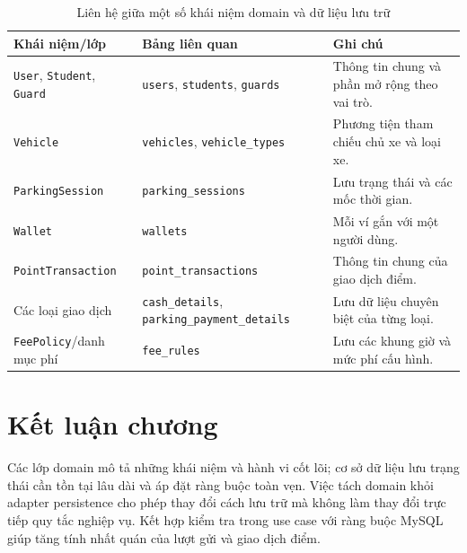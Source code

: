 \begin{table}[htbp]
\centering
\caption{Liên hệ giữa một số khái niệm domain và dữ liệu lưu trữ}
\label{tab:class-table-mapping}
\begin{tabular}{|p{4cm}|p{4cm}|p{5cm}|}
\hline
\textbf{Khái niệm/lớp} & \textbf{Bảng liên quan} & \textbf{Ghi chú} \\ \hline
\texttt{User}, \texttt{Student}, \texttt{Guard} & \texttt{users}, \texttt{students}, \texttt{guards} & Thông tin chung và phần mở rộng theo vai trò. \\ \hline
\texttt{Vehicle} & \texttt{vehicles}, \texttt{vehicle\_types} & Phương tiện tham chiếu chủ xe và loại xe. \\ \hline
\texttt{ParkingSession} & \texttt{parking\_sessions} & Lưu trạng thái và các mốc thời gian. \\ \hline
\texttt{Wallet} & \texttt{wallets} & Mỗi ví gắn với một người dùng. \\ \hline
\texttt{PointTransaction} & \texttt{point\_transactions} & Thông tin chung của giao dịch điểm. \\ \hline
Các loại giao dịch & \texttt{cash\_details}, \texttt{parking\_payment\_details} & Lưu dữ liệu chuyên biệt của từng loại. \\ \hline
\texttt{FeePolicy}/danh mục phí & \texttt{fee\_rules} & Lưu các khung giờ và mức phí cấu hình. \\ \hline
\end{tabular}
\end{table}

\section{Kết luận chương}

Các lớp domain mô tả những khái niệm và hành vi cốt lõi; cơ sở dữ liệu lưu trạng thái cần tồn tại lâu dài và áp đặt ràng buộc toàn vẹn. Việc tách domain khỏi adapter persistence cho phép thay đổi cách lưu trữ mà không làm thay đổi trực tiếp quy tắc nghiệp vụ. Kết hợp kiểm tra trong use case với ràng buộc MySQL giúp tăng tính nhất quán của lượt gửi và giao dịch điểm.
